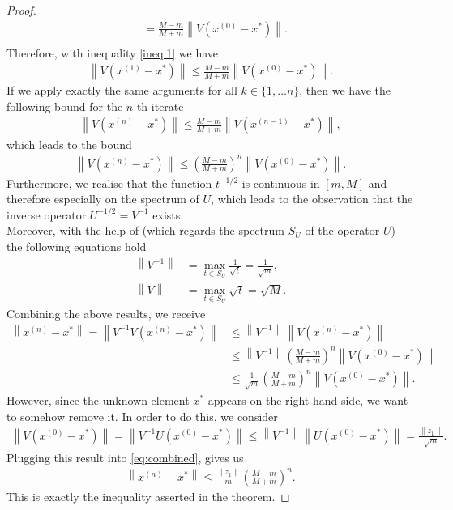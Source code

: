 \begin{proof}
\begin{align*}
&=\frac{M-m}{M+m} \left\|V(x^{(0)} - x^{\ast})\right\|.\\
\end{align*}
Therefore, with inequality \eqref{ineq:1} we have
\begin{align*}
\left\| V(x^{(1)} - x^{\ast}) \right\|\leq \frac{M-m}{M+m} \left\|V(x^{(0)} - x^{\ast})\right\|.
\end{align*}
If we apply exactly the same arguments for all $k\in\{1,\ldots n\}$, then we have the following bound for the $n$-th iterate
\begin{align*}
\left\| V(x^{(n)} - x^{\ast}) \right\|\leq \frac{M-m}{M+m} \left\|V(x^{(n-1)} - x^{\ast})\right\|,
\end{align*}
which leads to the bound
\begin{align*}
\left\| V(x^{(n)} - x^{\ast}) \right\|\leq \left(\frac{M-m}{M+m}\right)^n \left\|V(x^{(0)} - x^{\ast})\right\|.
\end{align*}
Furthermore, we realise that the function $t^{-1/2}$ is continuous in $[m, M]$ and therefore especially on the spectrum of $U$, which leads to the observation that the inverse operator $U^{-1/2} = V^{-1}$ exists.\\
Moreover, with the help of \cite[Theorem~V.6.2]{kantorovich2016functional} (which regards the spectrum $S_U$ of the operator $U$) the following equations hold
\begin{align*}
\left\|V^{-1}\right\| &= \max_{t\in S_U} \frac{1}{\sqrt{t}} = \frac{1}{\sqrt{m}},\\
\left\|V\right\| &= \max_{t\in S_U} \sqrt{t} = \sqrt{M}.
\end{align*}
Combining the above results, we receive
\begin{align}\label{eq:combined}
\left\| x^{(n)} - x^{\ast} \right\| = \left\| V^{-1}V\left(x^{(n)} - x^{\ast}\right) \right\|&\leq \left\| V^{-1}\right\| \left\|V\left(x^{(n)} - x^{\ast}\right) \right\|\nonumber\\
&\leq \left\| V^{-1}\right\|\left( \frac{M-m}{M+m} \right)^n \left\|V\left(x^{(0)} - x^{\ast}\right) \right\|\nonumber\\
&\leq \frac{1}{\sqrt{m}}\left( \frac{M-m}{M+m} \right)^n \left\|V\left(x^{(0)} - x^{\ast}\right) \right\|.
\end{align}
However, since the unknown element $x^{\ast}$ appears on the right-hand side, we want to somehow remove it. In order to do this, we consider
\begin{align*}
\left\|V(x^{(0)} - x^{\ast}) \right\| = \left\|V^{-1}U(x^{(0)} - x^{\ast}) \right\| \leq \left\|V^{-1}\right\| \left\|U(x^{(0)} - x^{\ast}) \right\| = \frac{\|z_1\|}{\sqrt{m}}.
\end{align*}
Plugging this result into \eqref{eq:combined}, gives us
\begin{align*}
\left\| x^{(n)} - x^{\ast} \right\| \leq \frac{\|z_1\|}{m}\left( \frac{M-m}{M+m} \right)^n.
\end{align*}
This is exactly the inequality asserted in the theorem.
\end{proof}

